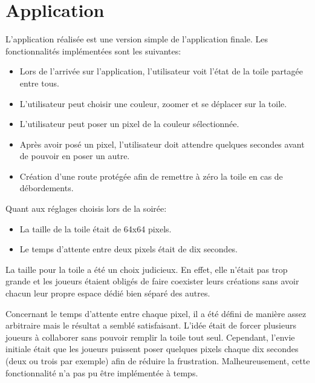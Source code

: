 

\section{Application}

L'application réalisée est une version simple de l'application finale. Les fonctionnalités implémentées sont les suivantes:

\begin{itemize}
  \item Lors de l'arrivée sur l'application, l'utilisateur voit l'état de la toile partagée entre tous.
  \item L'utilisateur peut choisir une couleur, zoomer et se déplacer sur la toile.
  \item L'utilisateur peut poser un pixel de la couleur sélectionnée.
  \item Après avoir posé un pixel, l'utilisateur doit attendre quelques secondes avant de pouvoir en poser un autre.
  \item Création d'une route protégée afin de remettre à zéro la toile en cas de débordements.
\end{itemize}

Quant aux réglages choisis lors de la soirée:

\begin{itemize}
  \item La taille de la toile était de 64x64 pixels.
  \item Le temps d'attente entre deux pixels était de dix secondes.
\end{itemize}

La taille pour la toile a été un choix judicieux. En effet, elle n'était pas trop grande et les joueurs étaient obligés de faire coexister leurs créations sans avoir chacun leur propre espace dédié bien séparé des autres.

Concernant le temps d'attente entre chaque pixel, il a été défini de manière assez arbitraire mais le résultat a semblé satisfaisant. L'idée était de forcer plusieurs joueurs à collaborer sans pouvoir remplir la toile tout seul. Cependant, l'envie initiale était que les joueurs puissent poser quelques pixels chaque dix secondes (deux ou trois par exemple) afin de réduire la frustration. Malheureusement, cette fonctionnalité n'a pas pu être implémentée à temps.

